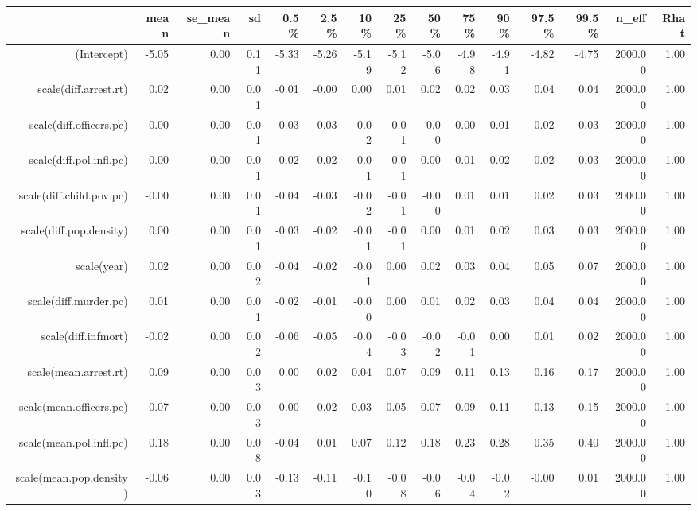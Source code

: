 \begin{table}[ht]
\centering
\begin{tabular}{rrrrrrrrrrrrrrr}
  \hline
 & mean & se\_mean & sd & 0.5\% & 2.5\% & 10\% & 25\% & 50\% & 75\% & 90\% & 97.5\% & 99.5\% & n\_eff & Rhat \\ 
  \hline
(Intercept) & -5.05 & 0.00 & 0.11 & -5.33 & -5.26 & -5.19 & -5.12 & -5.06 & -4.98 & -4.91 & -4.82 & -4.75 & 2000.00 & 1.00 \\ 
  scale(diff.arrest.rt) & 0.02 & 0.00 & 0.01 & -0.01 & -0.00 & 0.00 & 0.01 & 0.02 & 0.02 & 0.03 & 0.04 & 0.04 & 2000.00 & 1.00 \\ 
  scale(diff.officers.pc) & -0.00 & 0.00 & 0.01 & -0.03 & -0.03 & -0.02 & -0.01 & -0.00 & 0.00 & 0.01 & 0.02 & 0.03 & 2000.00 & 1.00 \\ 
  scale(diff.pol.infl.pc) & 0.00 & 0.00 & 0.01 & -0.02 & -0.02 & -0.01 & -0.01 & 0.00 & 0.01 & 0.02 & 0.02 & 0.03 & 2000.00 & 1.00 \\ 
  scale(diff.child.pov.pc) & -0.00 & 0.00 & 0.01 & -0.04 & -0.03 & -0.02 & -0.01 & -0.00 & 0.01 & 0.01 & 0.02 & 0.03 & 2000.00 & 1.00 \\ 
  scale(diff.pop.density) & 0.00 & 0.00 & 0.01 & -0.03 & -0.02 & -0.01 & -0.01 & 0.00 & 0.01 & 0.02 & 0.03 & 0.03 & 2000.00 & 1.00 \\ 
  scale(year) & 0.02 & 0.00 & 0.02 & -0.04 & -0.02 & -0.01 & 0.00 & 0.02 & 0.03 & 0.04 & 0.05 & 0.07 & 2000.00 & 1.00 \\ 
  scale(diff.murder.pc) & 0.01 & 0.00 & 0.01 & -0.02 & -0.01 & -0.00 & 0.00 & 0.01 & 0.02 & 0.03 & 0.04 & 0.04 & 2000.00 & 1.00 \\ 
  scale(diff.infmort) & -0.02 & 0.00 & 0.02 & -0.06 & -0.05 & -0.04 & -0.03 & -0.02 & -0.01 & 0.00 & 0.01 & 0.02 & 2000.00 & 1.00 \\ 
  scale(mean.arrest.rt) & 0.09 & 0.00 & 0.03 & 0.00 & 0.02 & 0.04 & 0.07 & 0.09 & 0.11 & 0.13 & 0.16 & 0.17 & 2000.00 & 1.00 \\ 
  scale(mean.officers.pc) & 0.07 & 0.00 & 0.03 & -0.00 & 0.02 & 0.03 & 0.05 & 0.07 & 0.09 & 0.11 & 0.13 & 0.15 & 2000.00 & 1.00 \\ 
  scale(mean.pol.infl.pc) & 0.18 & 0.00 & 0.08 & -0.04 & 0.01 & 0.07 & 0.12 & 0.18 & 0.23 & 0.28 & 0.35 & 0.40 & 2000.00 & 1.00 \\ 
  scale(mean.pop.density) & -0.06 & 0.00 & 0.03 & -0.13 & -0.11 & -0.10 & -0.08 & -0.06 & -0.04 & -0.02 & -0.00 & 0.01 & 2000.00 & 1.00 \\ 

\end{tabular}
\end{table}
